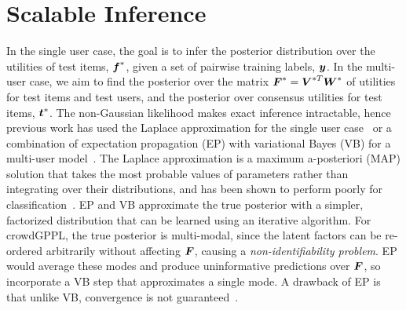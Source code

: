 \section{Scalable Inference}\label{sec:inf}

In the single user case, the goal is to infer the posterior distribution over the utilities of test items, $\boldsymbol f^*$, 
given a set of pairwise training labels, $\boldsymbol y$. In the multi-user case, we aim to find the posterior over the matrix
$\boldsymbol F^*=\boldsymbol V^{*T} \boldsymbol W^*$ of utilities for test items and test users,
and the posterior over consensus utilities for test items, $\boldsymbol t^*$.
The non-Gaussian likelihood makes exact inference intractable, hence previous work has used
 the Laplace approximation for the single user case~\citep{chu2005preference}
or a combination of expectation propagation (EP) with variational Bayes (VB) for a 
multi-user model~\citep{houlsby2012collaborative}.
The Laplace approximation is a maximum a-posteriori (MAP) solution that
takes the most probable values of parameters rather than integrating over their distributions,
and has been shown to perform poorly for classification~\citep{nickisch2008approximations}. 
EP and VB approximate the true posterior with a simpler, factorized distribution
that can be learned using an iterative algorithm.
For crowdGPPL, the true posterior is multi-modal, since the latent factors can be re-ordered arbitrarily without
affecting $\boldsymbol F$, causing a \emph{non-identifiability problem}.
EP would average these modes and produce uninformative predictions over $\boldsymbol F$, so
\citet{houlsby2012collaborative} incorporate a VB step that approximates a single mode.
A drawback of EP is that unlike VB, convergence is not guaranteed~\citep{minka2001expectation}.

